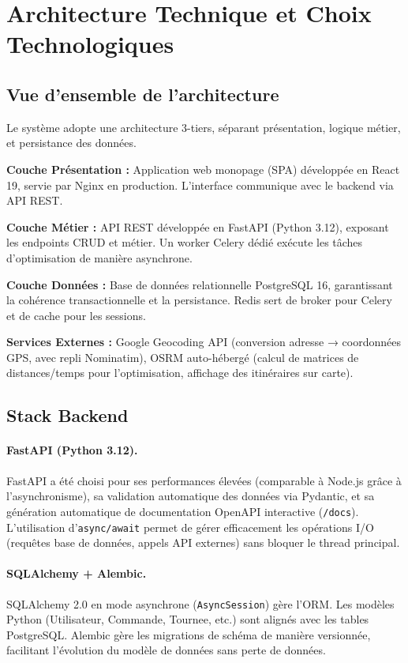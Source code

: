 \documentclass[12pt,a4paper]{report}
\begin{document}
\section{Architecture Technique et Choix Technologiques}

\subsection{Vue d'ensemble de l'architecture}

Le système adopte une architecture 3-tiers, séparant présentation, logique métier, et persistance des données.

\textbf{Couche Présentation :} Application web monopage (SPA) développée en React 19, servie par Nginx en production. L'interface communique avec le backend via API REST.


\textbf{Couche Métier :} API REST développée en FastAPI \cite{fastapi} (Python 3.12), exposant les endpoints CRUD et métier. Un worker Celery \cite{celery} dédié exécute les tâches d'optimisation de manière asynchrone.

\textbf{Couche Données :} Base de données relationnelle PostgreSQL \cite{postgresql} 16, garantissant la cohérence transactionnelle et la persistance. Redis sert de broker pour Celery et de cache pour les sessions.

\textbf{Services Externes :} Google Geocoding API (conversion adresse → coordonnées GPS, avec repli Nominatim), OSRM auto-hébergé (calcul de matrices de distances/temps pour l'optimisation, affichage des itinéraires sur carte).

\subsection{Stack Backend}

\paragraph{FastAPI (Python 3.12).} \cite{fastapi}
FastAPI a été choisi pour ses performances élevées (comparable à Node.js grâce à l'asynchronisme), sa validation automatique des données via Pydantic, et sa génération automatique de documentation OpenAPI interactive (\texttt{/docs}). L'utilisation d'\texttt{async/await} permet de gérer efficacement les opérations I/O (requêtes base de données, appels API externes) sans bloquer le thread principal.

\paragraph{SQLAlchemy + Alembic.}
SQLAlchemy 2.0 en mode asynchrone (\texttt{AsyncSession}) gère l'ORM. Les modèles Python (Utilisateur, Commande, Tournee, etc.) sont alignés avec les tables PostgreSQL. Alembic gère les migrations de schéma de manière versionnée, facilitant l'évolution du modèle de données sans perte de données.
\end{document}
